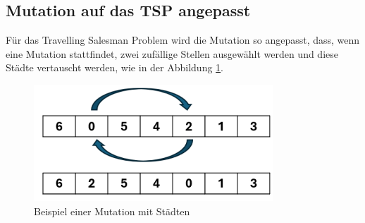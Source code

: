 \subsection{Mutation auf das TSP angepasst
\label{buch:paper:varalg:subsection:mutation_tsp}}
Für das Travelling Salesman Problem wird die Mutation so angepasst,
dass, wenn eine Mutation stattfindet, zwei zufällige Stellen ausgewählt
werden und diese Städte vertauscht werden, 
wie in der Abbildung \ref{fig:mutation_genetic_string_cities}.
\begin{figure}
	\centering
	\includegraphics[width=0.8\textwidth]{
        papers/varalg/images/teil3/09GeneticStringCitiesMutation.png
        }
	\caption{Beispiel einer Mutation mit Städten}
	\label{fig:mutation_genetic_string_cities}
\end{figure}
